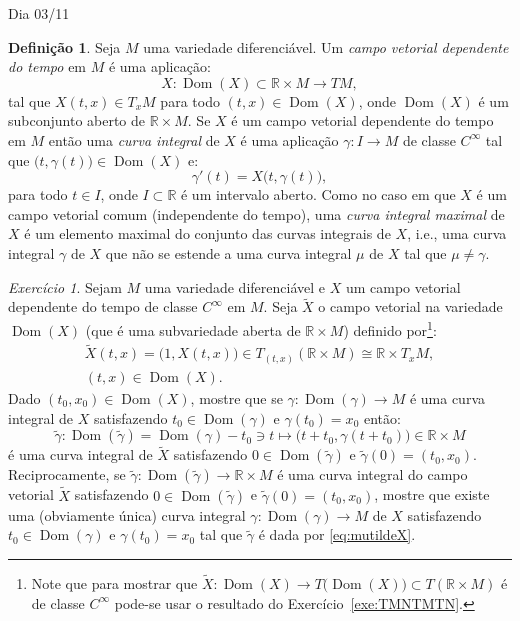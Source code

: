\documentclass[oneside,11pt]{amsart}
\newcommand{\R}{\mathds R}
\DeclareMathOperator{\Dom}{Dom}
\theoremstyle{remark}\newtheorem{exercise}{Exercício}[section]
\theoremstyle{plain}\newtheorem{teo}{Teorema}[section]
\theoremstyle{plain}\newtheorem{lem}[teo]{Lema}
\theoremstyle{plain}\newtheorem{prop}[teo]{Proposição}
\theoremstyle{definition}\newtheorem{defin}[teo]{Definição}
\theoremstyle{remark}\newtheorem{rem}[teo]{Observação}
\theoremstyle{definition}\newtheorem{example}[teo]{Exemplo}
\numberwithin{equation}{section}
\begin{document}
\begin{section}{Dia 03/11}
\begin{defin}
Seja $M$ uma variedade diferenciável. Um {\em campo vetorial dependente do tempo\/} em $M$ é uma aplicação:
\[X:\Dom(X)\subset\R\times M\longrightarrow TM,\]
tal que $X(t,x)\in T_xM$ para todo $(t,x)\in\Dom(X)$, onde $\Dom(X)$ é um subconjunto aberto de $\R\times M$. Se $X$ é um campo vetorial
dependente do tempo em $M$ então uma {\em curva integral\/} de $X$ é uma aplicação $\gamma:I\to M$ de classe $C^\infty$
tal que $\big(t,\gamma(t)\big)\in\Dom(X)$ e:
\[\gamma'(t)=X\big(t,\gamma(t)\big),\]
para todo $t\in I$, onde $I\subset\R$ é um intervalo aberto. Como no caso em que $X$ é um campo vetorial comum (independente do tempo), uma
{\em curva integral maximal\/} de $X$ é um elemento maximal do conjunto das curvas integrais
de $X$, i.e., uma curva integral $\gamma$ de $X$ que não se estende a uma curva integral $\mu$ de $X$ tal que $\mu\ne\gamma$.
\end{defin}

\begin{exercise}\label{exe:XdeptimeX}
Sejam $M$ uma variedade diferenciável e $X$ um campo vetorial dependente do tempo de classe $C^\infty$ em $M$. Seja $\widetilde X$ o campo vetorial
na variedade $\Dom(X)$ (que é uma subvariedade aberta de $\R\times M$) definido por\footnote{%
Note que para mostrar que $\widetilde X:\Dom(X)\to T\big(\Dom(X)\big)\subset T(\R\times M)$ é de classe $C^\infty$ pode-se usar o resultado
do Exercício~\ref{exe:TMNTMTN}.}:
\begin{multline}\label{eq:widetildeX}
\widetilde X(t,x)=\big(1,X(t,x)\big)\in T_{(t,x)}(\R\times M)\cong\R\times T_xM,\\
(t,x)\in\Dom(X).
\end{multline}
Dado $(t_0,x_0)\in\Dom(X)$, mostre que se $\gamma:\Dom(\gamma)\to M$ é uma curva integral de $X$ satisfazendo $t_0\in\Dom(\gamma)$ e $\gamma(t_0)=x_0$ então:
\begin{equation}\label{eq:mutildeX}
\tilde\gamma:\Dom(\tilde\gamma)=\Dom(\gamma)-t_0\ni t\longmapsto(t+t_0,\gamma(t+t_0)\big)\in\R\times M
\end{equation}
é uma curva integral de $\widetilde X$ satisfazendo $0\in\Dom(\tilde\gamma)$ e $\tilde\gamma(0)=(t_0,x_0)$. Reciprocamente,
se $\tilde\gamma:\Dom(\tilde\gamma)\to\R\times M$ é uma curva
integral do campo vetorial $\widetilde X$ satisfazendo $0\in\Dom(\tilde\gamma)$ e $\tilde\gamma(0)=(t_0,x_0)$, mostre que
existe uma (obviamente única)
curva integral $\gamma:\Dom(\gamma)\to M$ de $X$ satisfazendo $t_0\in\Dom(\gamma)$ e $\gamma(t_0)=x_0$
tal que $\tilde\gamma$ é dada por \eqref{eq:mutildeX}.
\end{exercise}


\end{section}
\end{document}
